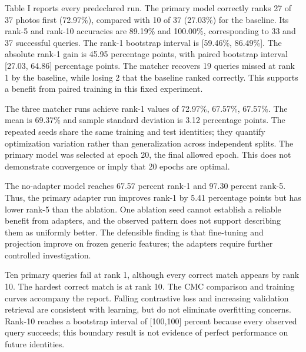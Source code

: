 \documentclass[cameraready]{ieeeconf}
\begin{document}
Table I reports every predeclared run. The primary model correctly ranks 27 of 37 photos first (72.97\%), compared with 10 of 37 (27.03\%) for the baseline. Its rank-5 and rank-10 accuracies are 89.19\% and 100.00\%, corresponding to 33 and 37 successful queries. The rank-1 bootstrap interval is [59.46\%, 86.49\%]. The absolute rank-1 gain is 45.95 percentage points, with paired bootstrap interval [27.03, 64.86] percentage points. The matcher recovers 19 queries missed at rank 1 by the baseline, while losing 2 that the baseline ranked correctly. This supports a benefit from paired training in this fixed experiment.


The three matcher runs achieve rank-1 values of 72.97\%, 67.57\%, 67.57\%. The mean is 69.37\% and sample standard deviation is 3.12 percentage points. The repeated seeds share the same training and test identities; they quantify optimization variation rather than generalization across independent splits. The primary model was selected at epoch 20, the final allowed epoch. This does not demonstrate convergence or imply that 20 epochs are optimal.


The no-adapter model reaches 67.57 percent rank-1 and 97.30 percent rank-5. Thus, the primary adapter run improves rank-1 by 5.41 percentage points but has lower rank-5 than the ablation. One ablation seed cannot establish a reliable benefit from adapters, and the observed pattern does not support describing them as uniformly better. The defensible finding is that fine-tuning and projection improve on frozen generic features; the adapters require further controlled investigation.


Ten primary queries fail at rank 1, although every correct match appears by rank 10. The hardest correct match is at rank 10. The CMC comparison and training curves accompany the report. Falling contrastive loss and increasing validation retrieval are consistent with learning, but do not eliminate overfitting concerns. Rank-10 reaches a bootstrap interval of [100,100] percent because every observed query succeeds; this boundary result is not evidence of perfect performance on future identities.
\end{document}
